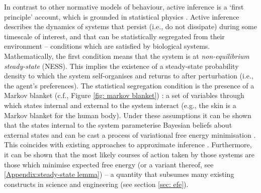 \documentclass[review,12pt,authoryear]{elsarticle}
\begin{document}
In contrast to other normative models of behaviour, active inference is a ‘first principle’ account, which is grounded in statistical physics \citep{parrMarkovBlanketsInformation2020,fristonFreeEnergyPrinciple2019}. Active inference describes the dynamics of systems that persist (i.e., do not dissipate) during some timescale of interest, and that can be statistically segregated from their environment -- conditions which are satisfied by biological systems. Mathematically, the first condition means that the system is at \textit{non-equilibrium steady-state} (NESS). This implies the existence of a steady-state probability density to which the system self-organises and returns to after perturbation (i.e., the agent's preferences). The statistical segregation condition is the presence of a Markov blanket (c.f., Figure \ref{fig: markov blanket}) \citep{kirchhoffMarkovBlanketsLife2018,pearlGraphicalModelsProbabilistic1998}: a set of variables through which states internal and external to the system interact (e.g., the skin is a Markov blanket for the human body). Under these assumptions it can be shown that the states internal to the system parameterise Bayesian beliefs about external states and can be cast a process of variational free energy minimisation \citep{parrMarkovBlanketsInformation2020,fristonFreeEnergyPrinciple2019}. This coincides with existing approaches to approximate inference \citep{bishopPatternRecognitionMachine2006,bealVariationalAlgorithmsApproximate2003,bleiVariationalInferenceReview2017,jordanIntroductionVariationalMethods1998}. Furthermore, it can be shown that the most likely courses of action taken by those systems are those which minimise expected free energy (or a variant thereof, see \ref{Appendix:steady-state lemma}) -- a quantity that subsumes many existing constructs in science and engineering (see section \ref{sec: efe}).
\end{document}
